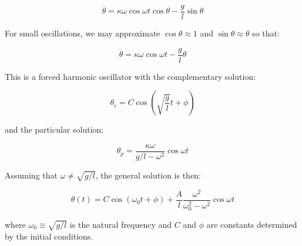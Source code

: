 \documentclass[12pt]{article}
\begin{document}
\begin{equation}
    \ddot{\theta} = \kappa \omega \cos{\omega t} \cos{\theta} - \frac{g}{l} \sin{\theta}
\end{equation}

For small oscillations, we may approximate $\cos{\theta} \approx 1$ and $\sin{\theta} \approx \theta$ so that:

\begin{equation}
    \ddot{\theta} = \kappa \omega \cos{\omega t} - \frac{g}{l} \theta
\end{equation}

This is a forced harmonic oscillator with the complementary solution:

\begin{equation}
    \theta_{c} = C \cos{\left( \sqrt{\frac{g}{l}} t + \phi \right)}
\end{equation}

and the particular solution:

\begin{equation}
    \theta_{p} = \frac{\kappa \omega}{g/l - \omega^{2}} \cos{\omega t}
\end{equation}

Assuming that $\omega \neq \sqrt{g/l}$, the general solution is then:

\begin{equation}
    \theta(t) = C \cos{\left( \omega_{0} t + \phi \right)} + \frac{A}{l} \frac{\omega^{2}}{\omega_{0}^{2} - \omega^{2}} \cos{\omega t}
\end{equation}

where $\omega_{0} \equiv \sqrt{g/l}$ is the natural frequency and $C$ and $\phi$ are constants determined by the initial conditions.
\end{document}
